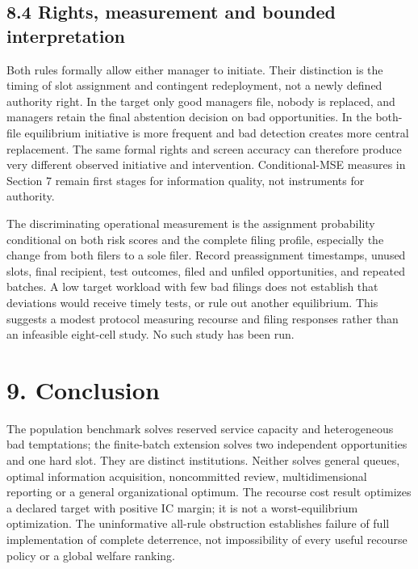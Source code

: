 \documentclass[
  11pt,
]{article}
\begin{document}
\subsection{8.4 Rights, measurement and bounded
interpretation}\label{rights-measurement-and-bounded-interpretation}

Both rules formally allow either manager to initiate. Their distinction
is the timing of slot assignment and contingent redeployment, not a
newly defined authority right. In the target only good managers file,
nobody is replaced, and managers retain the final abstention decision on
bad opportunities. In the both-file equilibrium initiative is more
frequent and bad detection creates more central replacement. The same
formal rights and screen accuracy can therefore produce very different
observed initiative and intervention. Conditional-MSE measures in
Section 7 remain first stages for information quality, not instruments
for authority.

The discriminating operational measurement is the assignment probability
conditional on both risk scores and the complete filing profile,
especially the change from both filers to a sole filer. Record
preassignment timestamps, unused slots, final recipient, test outcomes,
filed and unfiled opportunities, and repeated batches. A low target
workload with few bad filings does not establish that deviations would
receive timely tests, or rule out another equilibrium. This suggests a
modest protocol measuring recourse and filing responses rather than an
infeasible eight-cell study. No such study has been run.

\section{9. Conclusion}\label{limitations-and-conclusion}

The population benchmark solves reserved service capacity and
heterogeneous bad temptations; the finite-batch extension solves two
independent opportunities and one hard slot. They are distinct
institutions. Neither solves general queues, optimal information
acquisition, noncommitted review, multidimensional reporting or a
general organizational optimum. The recourse cost result optimizes a
declared target with positive IC margin; it is not a worst-equilibrium
optimization. The uninformative all-rule obstruction establishes failure
of full implementation of complete deterrence, not impossibility of
every useful recourse policy or a global welfare ranking.
\end{document}
